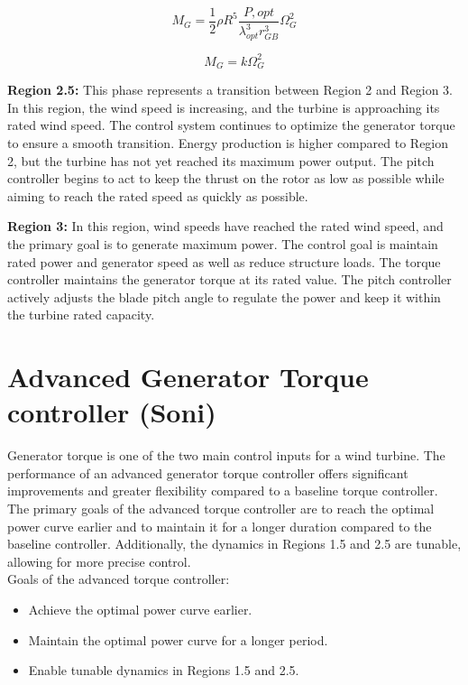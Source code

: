\begin{equation}
	M_{G} = \frac{1}{2} \rho R^5 \frac{P,opt}{{\lambda_{opt}^3 r_{GB}^3}} \Omega_{G}^2
	\label{equation:MG}
\end{equation}

\begin{equation}
	M_{G} = k\Omega_{G}^2
	\label{equation:MG_2}
\end{equation}

\textbf{Region 2.5:} This phase represents a transition between Region 2 and Region 3. In this region, the wind speed is increasing, and the turbine is approaching its rated wind speed. The control system continues to optimize the generator torque to ensure a smooth transition. Energy production is higher compared to Region 2, but the turbine has not yet reached its maximum power output. The pitch controller begins to act to keep the thrust on the rotor as low as possible while aiming to reach the rated speed as quickly as possible.


\textbf{Region 3:} In this region, wind speeds have reached the rated wind speed, and the primary goal is to generate maximum power. The control goal is maintain rated power and generator speed as well as reduce structure loads. The torque controller maintains the generator torque at its rated value. The pitch controller actively adjusts the blade pitch angle to regulate the power and keep it within the turbine rated capacity.

\section{Advanced Generator Torque controller (Soni)} \label{Torque controller}
Generator torque is one of the two main control inputs for a wind turbine. The performance of an advanced generator torque controller offers significant improvements and greater flexibility compared to a baseline torque controller. The primary goals of the advanced torque controller are to reach the optimal power curve earlier and to maintain it for a longer duration compared to the baseline controller. Additionally, the dynamics in Regions 1.5 and 2.5 are tunable, allowing for more precise control.
\\[16pt]
Goals of the advanced torque controller:

\begin{itemize}
	\item Achieve the optimal power curve earlier.
	\item Maintain the optimal power curve for a longer period.
	\item Enable tunable dynamics in Regions 1.5 and 2.5.
\end{itemize}

